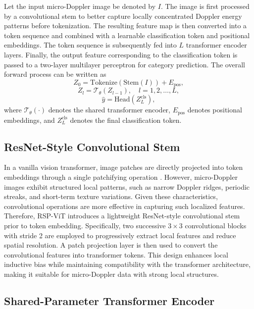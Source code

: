 \documentclass{svproc}
\begin{document}
Let the input micro-Doppler image be denoted by $I$. The image is first processed by a convolutional stem to better capture locally concentrated Doppler energy patterns before tokenization. The resulting feature map is then converted into a token sequence and combined with a learnable classification token and positional embeddings. The token sequence is subsequently fed into $L$ transformer encoder layers. Finally, the output feature corresponding to the classification token is passed to a two-layer multilayer perceptron for category prediction. The overall forward process can be written as
\begin{equation}
Z_0 = \mathrm{Tokenize}(\mathrm{Stem}(I)) + E_{\mathrm{pos}},
\end{equation}
\begin{equation}
Z_l = \mathcal{T}_{\theta}(Z_{l-1}), \quad l=1,2,\ldots,L,
\end{equation}
\begin{equation}
\hat{y} = \mathrm{Head}(Z_L^{\mathrm{cls}}),
\end{equation}
where $\mathcal{T}_{\theta}(\cdot)$ denotes the shared transformer encoder, $E_{\mathrm{pos}}$ denotes positional embeddings, and $Z_L^{\mathrm{cls}}$ denotes the final classification token.

\subsection{ResNet-Style Convolutional Stem}

In a vanilla vision transformer, image patches are directly projected into token embeddings through a single patchifying operation \cite{Dosovitskiy2021ViT}. However, micro-Doppler images exhibit structured local patterns, such as narrow Doppler ridges, periodic streaks, and short-term texture variations. Given these characteristics, convolutional operations are more effective in capturing such localized features. Therefore, RSP-ViT introduces a lightweight ResNet-style convolutional stem prior to token embedding. Specifically, two successive $3 \times 3$ convolutional blocks with stride 2 are employed to progressively extract local features and reduce spatial resolution. A patch projection layer is then used to convert the convolutional features into transformer tokens. This design enhances local inductive bias while maintaining compatibility with the transformer architecture, making it suitable for micro-Doppler data with strong local structures.

\subsection{Shared-Parameter Transformer Encoder}
\end{document}
